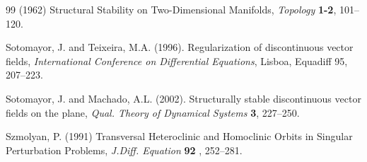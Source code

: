 \documentclass[11pt,psamsfonts]{article}
\theoremstyle{definition}
\theoremstyle{remark}
\begin{document}
\begin{thebibliography}{99}
 (1962) Structural Stability on Two-Dimensional Manifolds,
\textit{Topology} \textbf{ 1-2}, 101–120.

 {Sotomayor, J. and Teixeira, M.A.} (1996).
Regularization of  discontinuous vector fields,
\textit{International Conference on Differential Equations}, Lisboa,
Equadiff 95, 207--223.

 {Sotomayor, J. and Machado, A.L.} (2002).
Structurally stable discontinuous vector fields on the plane, \textit{Qual. Theory of Dynamical Systems} \textbf{3}, 227--250.

 {Szmolyan, P.} (1991)
Transversal Heteroclinic and Homoclinic Orbits in Singular
Perturbation Problems, \textit{J.Diff. Equation} \textbf{92} ,
252--281.


\end{thebibliography}
\end{document}
